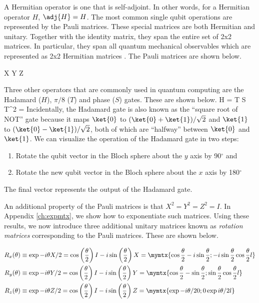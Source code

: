 A Hermitian operator is one that is self-adjoint. In other words, for a Hermitian operator $H$, $\adj{H} = H$. The most common single qubit operations are represented by the Pauli matrices. These special matrices are both Hermitian and unitary. Together with the identity matrix, they span the entire set of 2x2 matrices. In particular, they span all quantum mechanical observables which are represented as 2x2 Hermitian matrices \cite{griffiths}. The Pauli matrices are shown below.

\beq
X \equiv {} \text{ ; } Y \equiv {} \text{ ; } Z \equiv {}
\eeq

Three other operators that are commonly used in quantum computing are the Hadamard ($H$), $\pi/8$ ($T$) and phase ($S$) gates. These are shown below.
\beq
H \equiv {} =  \text{ ; } T \equiv {} \text{ ; } S \equiv T^2 = 
\eeq
Incidentally, the Hadamard gate is also known as the ``square root of NOT'' gate because it maps $\ket{0}$ to $(\ket{0} + \ket{1})/\sqrt{2}$ and $\ket{1}$ to $(\ket{0} - \ket{1})/\sqrt{2}$, both of which are ``halfway'' between $\ket{0}$ and $\ket{1}$. We can visualize the operation of the Hadamard gate in two steps: 
\begin{enumerate}
\item Rotate the qubit vector in the Bloch sphere about the $y$ axis by 90$^{\circ}$ and
\item Rotate the new qubit vector in the Bloch sphere about the $x$ axis by 180$^{\circ}$
\end{enumerate}
The final vector represents the output of the Hadamard gate.

An additional property of the Pauli matrices is that $X^2 = Y^2 = Z^2 = I$. In Appendix \ref{ch:expmtx}, we show how to exponentiate such matrices. Using these results, we now introduce three additional unitary matrices known as \textit{rotation matrices} corresponding to the Pauli matrices. These are shown below.

\begin{align}
R_x(\theta) &\equiv \exp{-i\theta X/2} = \cos\left(\frac{\theta}{2}\right)I - i\sin\left(\frac{\theta}{2}\right)X = 
\mymtx{\cos\frac{\theta}{2} -i\sin\frac{\theta}{2} ; -i\sin\frac{\theta}{2} \cos\frac{\theta}{2}l}\\ 
R_y(\theta) &\equiv \exp{-i\theta Y/2} = \cos\left(\frac{\theta}{2}\right)I - i\sin\left(\frac{\theta}{2}\right)Y = 
\mymtx{\cos\frac{\theta}{2} -\sin\frac{\theta}{2} ; \sin\frac{\theta}{2} \cos\frac{\theta}{2}l}\\ 
R_z(\theta) &\equiv \exp{-i\theta Z/2} = \cos\left(\frac{\theta}{2}\right)I - i\sin\left(\frac{\theta}{2}\right)Z = 
\mymtx{\exp{-i\theta/2} 0 ; 0 \exp{i\theta/2}l}
\end{align}

